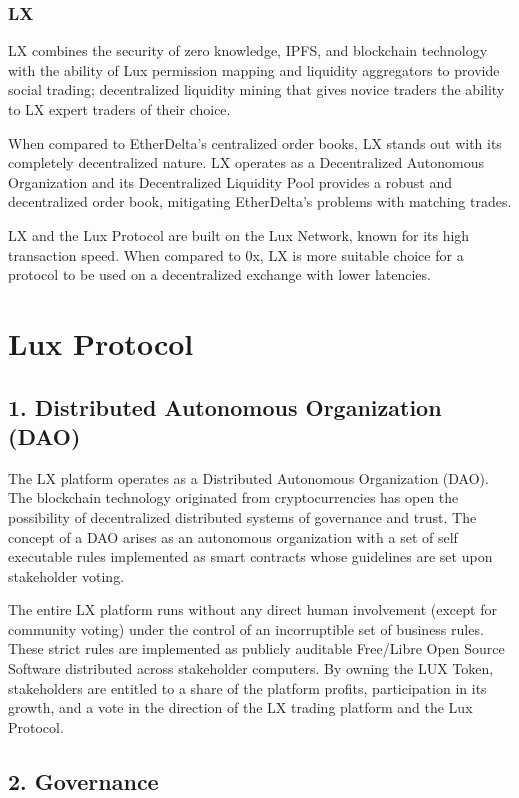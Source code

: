 \documentclass[11pt]{article}
\begin{document}
\subsubsection{LX}

LX combines the security of zero knowledge, IPFS, and blockchain technology with the ability of Lux  permission mapping and liquidity aggregators to provide social trading;  decentralized liquidity mining that gives novice traders the ability to LX expert traders of their choice.


When compared to EtherDelta's centralized order books, LX stands out with its completely decentralized nature. LX operates as a Decentralized Autonomous Organization and its Decentralized Liquidity Pool provides a robust and decentralized order book, mitigating EtherDelta's problems with matching trades.


LX and the Lux Protocol are built on the Lux Network, known for its high transaction speed. When compared to 0x, LX is more suitable choice for a protocol to be used on a decentralized exchange with lower latencies.


\section{Lux Protocol}

\subsection{1. Distributed Autonomous Organization (DAO)}

The LX platform operates as a Distributed Autonomous Organization (DAO). The blockchain technology originated from cryptocurrencies has open the possibility of decentralized distributed systems of governance and trust. The concept of a DAO arises as an autonomous organization with a set of self executable rules implemented as smart contracts whose guidelines are set upon stakeholder voting.


The entire LX platform runs without any direct human involvement (except for community voting) under the control of an incorruptible set of business rules. These strict rules are implemented as publicly auditable Free/Libre Open Source Software distributed across stakeholder computers. By owning the LUX Token, stakeholders are entitled to a share of the platform profits, participation in its growth, and a vote in the direction of the LX trading platform and the Lux Protocol.


\subsection{2. Governance}
\end{document}
